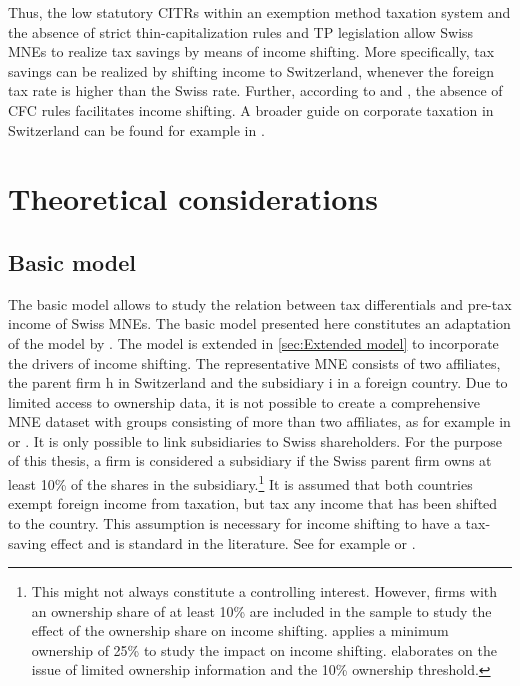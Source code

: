 \documentclass[10pt,twocolumn,oneside,cmyk]{article}
\begin{document}
Thus, the low statutory CITRs within an exemption method taxation system and the absence of strict thin-capitalization rules and TP legislation allow Swiss MNEs to realize tax savings by means of income shifting. More specifically, tax savings can be realized by shifting income to Switzerland, whenever the foreign tax rate is higher than the Swiss rate. Further, according to \textcite[243-244]{gehriger_konzernfinanzierungsgesellschaften_2008} and \textcite[1527-1528]{ruf_taxation_2012}, the absence of CFC rules facilitates income shifting. A broader guide on corporate taxation in Switzerland can be found for example in \textcite[131-135]{feld_impact_2002}.

\section{Theoretical considerations} \label{sec:Theoretical considerations}
\subsection{Basic model} \label{sec:Basic model}
The basic model allows to study the relation between tax differentials and pre-tax income of Swiss MNEs. The basic model presented here constitutes an adaptation of the model by \textcite{huizinga_international_2008}. The model is extended in \cref{sec:Extended model} to incorporate the drivers of income shifting. The representative MNE consists of two affiliates, the parent firm h in Switzerland and the subsidiary i in a foreign country. Due to limited access to ownership data, it is not possible to create a comprehensive MNE dataset with groups consisting of more than two affiliates, as for example in \textcite[1169]{huizinga_international_2008} or \textcite[430]{beer_profit_2015}. It is only possible to link subsidiaries to Swiss shareholders. For the purpose of this thesis, a firm is considered a subsidiary if the Swiss parent firm owns at least 10\% of the shares in the subsidiary.\footnote{This might not always constitute a controlling interest. However, firms with an ownership share of at least 10\% are included in the sample to study the effect of the ownership share on income shifting. \textcite[16]{dischinger_profit_2008} applies a minimum ownership of 25\% to study the impact on income shifting.  elaborates on the issue of limited ownership information and the 10\% ownership threshold.} It is assumed that both countries exempt foreign income from taxation, but tax any income that has been shifted to the country. This assumption is necessary for income shifting to have a tax-saving effect and is standard in the literature. See for example \textcite[312]{haufler_corporate_2000} or \textcite[1151]{mintz_income_2004}.
\end{document}
